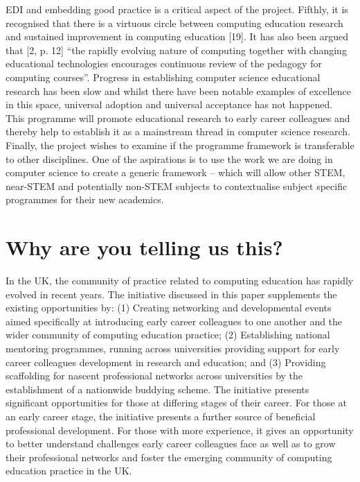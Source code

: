 \documentclass[sigconf]{acmart}
\begin{document}
EDI and embedding good practice is a critical aspect of the
project. Fifthly, it is recognised that there is a virtuous circle
between computing education research and sustained improvement in
computing education [19]. It has also been argued that [2, p. 12] “the
rapidly evolving nature of computing together with changing
educational technologies encourages continuous review of the pedagogy
for computing courses”. Progress in establishing computer science
educational research has been slow and whilst there have been notable
examples of excellence in this space, universal adoption and universal
acceptance has not happened. This programme will promote educational
research to early career colleagues and thereby help to establish it
as a mainstream thread in computer science research. Finally, the
project wishes to examine if the programme framework is transferable
to other disciplines. One of the aspirations is to use the work we are
doing in computer science to create a generic framework – which will
allow other STEM, near-STEM and potentially non-STEM subjects to
contextualise subject specific programmes for their new academics.


\section{Why are you telling us this?}
 In the UK, the community of practice related to computing education
has rapidly evolved in recent years. The initiative discussed in this
paper supplements the existing opportunities by: (1) Creating
networking and developmental events aimed specifically at introducing
early career colleagues to one another and the wider community of
computing education practice; (2) Establishing national mentoring
programmes, running across universities providing support for early
career colleagues development in research and education; and (3)
Providing scaffolding for nascent professional networks across
universities by the establishment of a nationwide buddying scheme. The
initiative presents significant opportunities for those at differing
stages of their career.  For those at an early career stage, the
initiative presents a further source of beneficial professional
development. For those with more experience, it gives an opportunity
to better understand challenges early career colleagues face as well
as to grow their professional networks and foster the emerging
community of computing education practice in the UK.

	
	
	




\end{document}
